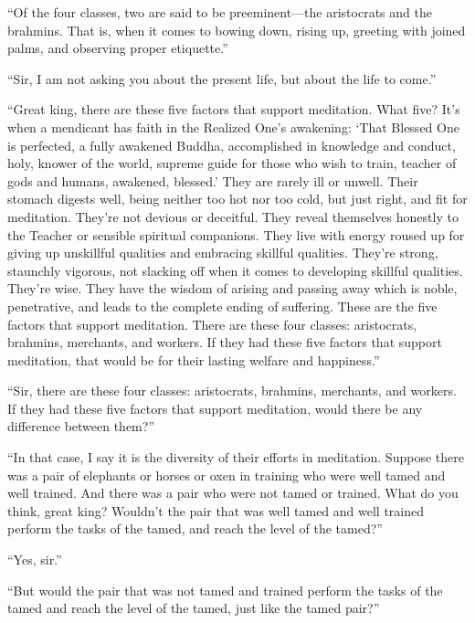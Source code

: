 \documentclass[12pt,openany]{book}%
\begin{document}
“Of the four classes, two are said to be preeminent—the aristocrats and the brahmins. That is, when it comes to bowing down, rising up, greeting with joined palms, and observing proper etiquette.” 

“Sir, I am not asking you about the present life, but about the life to come.” 

“Great king, there are these five factors that support meditation. What five? It’s when a mendicant has faith in the Realized One’s awakening: ‘That Blessed One is perfected, a fully awakened Buddha, accomplished in knowledge and conduct, holy, knower of the world, supreme guide for those who wish to train, teacher of gods and humans, awakened, blessed.’ They are rarely ill or unwell. Their stomach digests well, being neither too hot nor too cold, but just right, and fit for meditation. They’re not devious or deceitful. They reveal themselves honestly to the Teacher or sensible spiritual companions. They live with energy roused up for giving up unskillful qualities and embracing skillful qualities. They’re strong, staunchly vigorous, not slacking off when it comes to developing skillful qualities. They’re wise. They have the wisdom of arising and passing away which is noble, penetrative, and leads to the complete ending of suffering. These are the five factors that support meditation. There are these four classes: aristocrats, brahmins, merchants, and workers. If they had these five factors that support meditation, that would be for their lasting welfare and happiness.” 

“Sir, there are these four classes: aristocrats, brahmins, merchants, and workers. If they had these five factors that support meditation, would there be any difference between them?” 

“In that case, I say it is the diversity of their efforts in meditation. Suppose there was a pair of elephants or horses or oxen in training who were well tamed and well trained. And there was a pair who were not tamed or trained. What do you think, great king? Wouldn’t the pair that was well tamed and well trained perform the tasks of the tamed, and reach the level of the tamed?” 

“Yes, sir.” 

“But would the pair that was not tamed and trained perform the tasks of the tamed and reach the level of the tamed, just like the tamed pair?” 
\end{document}
